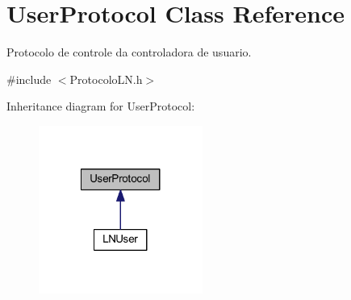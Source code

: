 \hypertarget{class_user_protocol}{\section{User\-Protocol Class Reference}
\label{class_user_protocol}
}


Protocolo de controle da controladora de usuario.  




{\ttfamily \#include $<$Protocolo\-L\-N.\-h$>$}



Inheritance diagram for User\-Protocol\-:\nopagebreak
\begin{figure}[H]
\begin{center}
\leavevmode
\includegraphics[width=152pt]{class_user_protocol__inherit__graph}
\end{center}
\end{figure}
